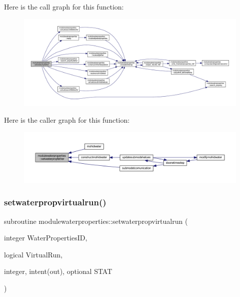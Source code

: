 Here is the call graph for this function\+:\nopagebreak
\begin{figure}[H]
\begin{center}
\leavevmode
\includegraphics[width=350pt]{namespacemodulewaterproperties_abab3678d93906f85e9e8392ced1e6ab4_cgraph}
\end{center}
\end{figure}
Here is the caller graph for this function\+:\nopagebreak
\begin{figure}[H]
\begin{center}
\leavevmode
\includegraphics[width=350pt]{namespacemodulewaterproperties_abab3678d93906f85e9e8392ced1e6ab4_icgraph}
\end{center}
\end{figure}
\mbox{\label{namespacemodulewaterproperties_abc01d8d69bf69056b5ad8b7fc0ebb668}} 
\subsubsection{\texorpdfstring{setwaterpropvirtualrun()}{setwaterpropvirtualrun()}}
{\footnotesize\ttfamily subroutine modulewaterproperties\+::setwaterpropvirtualrun (\begin{DoxyParamCaption}\item[{integer}]{Water\+Properties\+ID,  }\item[{logical}]{Virtual\+Run,  }\item[{integer, intent(out), optional}]{S\+T\+AT }\end{DoxyParamCaption})\hspace{0.3cm}{\ttfamily [private]}}

